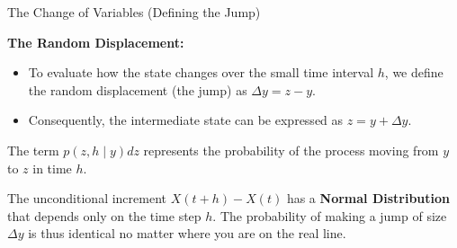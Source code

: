 \documentclass{beamer}
\begin{document}
\begin{frame}{The Change of Variables (Defining the Jump)}

\vspace{-0.4cm}

\textbf{The Random Displacement:}
\begin{itemize}
    \item To evaluate how the state changes over the small time interval $h$, we define the random displacement (the jump) as $\Delta y = z - y$. 
    \item Consequently, the intermediate state can be expressed as $z = y + \Delta y$.
\end{itemize}

\vspace{0.3cm}

The term $p(z, h \mid y) dz$ represents the probability of the process moving from $y$ to $z$ in time $h$. 

\vspace{0.3cm}

The unconditional increment $X(t+h) - X(t)$ has a \textbf{Normal Distribution} that depends only on the time step $h$.
The probability of making a jump of size $\Delta y$ is thus identical no matter where you are on the real line.

\end{frame}
\end{document}
